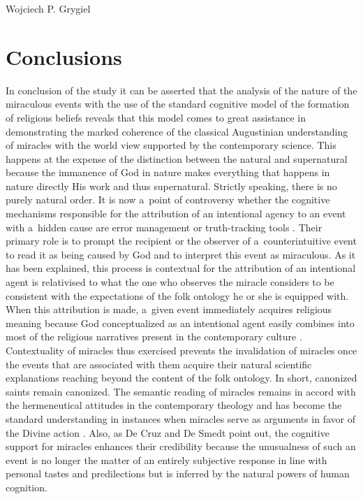 \begin{artengenv}{Wojciech P. Grygiel}
\section*{Conclusions}
In conclusion of the study it can be asserted that the analysis of the nature of the miraculous events with the use of the standard cognitive model of the formation of religious beliefs reveals that this model comes to great assistance in demonstrating the marked coherence of the classical Augustinian understanding of miracles with the world view supported by the contemporary science. This happens at the expense of the distinction between the natural and supernatural because the immanence of God in nature makes everything that happens in nature directly His work and thus supernatural. Strictly speaking, there is no purely natural order. It is now a~point of controversy whether the cognitive mechanisms responsible for the attribution of an intentional agency to an event with a~hidden cause are error management or truth-tracking tools
\parencites[][]{barrett_should_2013}[][]{van_eyghen_is_2019}. %
 Their primary role is to prompt the recipient or the observer of a~counterintuitive event to read it as being caused by God and to interpret this event as miraculous. As it has been explained, this process is contextual for the attribution of an intentional agent is relativised to what the one who observes the miracle considers to be consistent with the expectations of the folk ontology he or she is equipped with. When this attribution is made, a~given event immediately acquires religious meaning because God conceptualized as an intentional agent easily combines into most of the religious narratives present in the contemporary culture 
\parencite[e.g.][pp.172–178]{de_cruz_natural_2015}. %
 Contextuality of miracles thus exercised prevents the invalidation of miracles once the events that are associated with them acquire their natural scientific explanations reaching beyond the content of the folk ontology. In short, canonized saints remain canonized. The semantic reading of miracles remains in accord with the hermeneutical attitudes in the contemporary theology and has become the standard understanding in instances when miracles serve as arguments in favor of the Divine action 
\parencite[e.g.][pp.211–290]{rusecki_traktat_2006}. %
 Also, as De Cruz and De Smedt 
\parencite*[][p.160]{de_cruz_natural_2015} %
 point out, the cognitive support for miracles enhances their credibility because the unusualness of such an event is no longer the matter of an entirely subjective response in line with personal tastes and predilections but is inferred by the natural powers of human cognition.


\end{artengenv}
